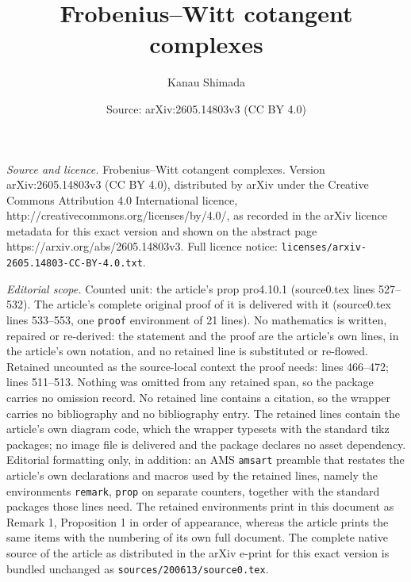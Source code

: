 \documentclass[10pt,a4paper]{amsart}
\title{Frobenius--Witt cotangent complexes}
\author{Kanau Shimada}
\date{Source: arXiv:2605.14803v3 (CC BY 4.0)}
\begin{document}
\maketitle

\noindent\emph{Source and licence.} Frobenius--Witt cotangent complexes. Version arXiv:2605.14803v3 (CC BY 4.0), distributed by arXiv under the Creative Commons Attribution 4.0 International licence, http://creativecommons.org/licenses/by/4.0/, as recorded in the arXiv licence metadata for this exact version and shown on the abstract page https://arxiv.org/abs/2605.14803v3. Full licence notice: \texttt{licenses/arxiv-2605.14803-CC-BY-4.0.txt}.\par\smallskip

\noindent\textit{Editorial scope.} Counted unit: the article's prop pro4.10.1 (source0.tex lines 527--532). The article's complete original proof of it is delivered with it (source0.tex lines 533--553, one \texttt{proof} environment of 21 lines). No mathematics is written, repaired or re-derived: the statement and the proof are the article's own lines, in the article's own notation, and no retained line is substituted or re-flowed.  Retained uncounted as the source-local context the proof needs: lines 466--472; lines 511--513.  Nothing was omitted from any retained span, so the package carries no omission record.  No retained line contains a citation, so the wrapper carries no bibliography and no bibliography entry.  The retained lines contain the article's own diagram code, which the wrapper typesets with the standard tikz packages; no image file is delivered and the package declares no asset dependency.  Editorial formatting only, in addition: an AMS \texttt{amsart} preamble that restates the article's own declarations and macros used by the retained lines, namely the environments \texttt{remark}, \texttt{prop} on separate counters, together with the standard packages those lines need.  The retained environments print in this document as Remark 1, Proposition 1 in order of appearance, whereas the article prints the same items with the numbering of its own full document.  The complete native source of the article as distributed in the arXiv e-print for this exact version is bundled unchanged as \texttt{sources/200613/source0.tex}.
\end{document}
